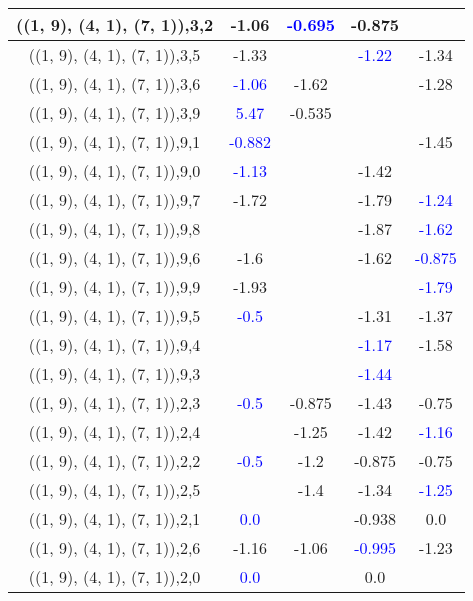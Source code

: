 \documentclass{article}
\begin{document}
\begin{center}
\begin{longtable}{|c|c|c|c|c|}
        	\hline
        	((1, 9), (4, 1), (7, 1)),3,2&-1.06& \textcolor{blue}{-0.695}&-0.875&\\
        	\hline
        	((1, 9), (4, 1), (7, 1)),3,5&-1.33&& \textcolor{blue}{-1.22}&-1.34\\
        	\hline
        	((1, 9), (4, 1), (7, 1)),3,6& \textcolor{blue}{-1.06}&-1.62&&-1.28\\
        	\hline
        	((1, 9), (4, 1), (7, 1)),3,9& \textcolor{blue}{5.47}&-0.535&&\\
        	\hline
        	((1, 9), (4, 1), (7, 1)),9,1& \textcolor{blue}{-0.882}&&&-1.45\\
        	\hline
        	((1, 9), (4, 1), (7, 1)),9,0& \textcolor{blue}{-1.13}&&-1.42&\\
        	\hline
        	((1, 9), (4, 1), (7, 1)),9,7&-1.72&&-1.79& \textcolor{blue}{-1.24}\\
        	\hline
        	((1, 9), (4, 1), (7, 1)),9,8&&&-1.87& \textcolor{blue}{-1.62}\\
        	\hline
        	((1, 9), (4, 1), (7, 1)),9,6&-1.6&&-1.62& \textcolor{blue}{-0.875}\\
        	\hline
        	((1, 9), (4, 1), (7, 1)),9,9&-1.93&&& \textcolor{blue}{-1.79}\\
        	\hline
        	((1, 9), (4, 1), (7, 1)),9,5& \textcolor{blue}{-0.5}&&-1.31&-1.37\\
        	\hline
        	((1, 9), (4, 1), (7, 1)),9,4&&& \textcolor{blue}{-1.17}&-1.58\\
        	\hline
        	((1, 9), (4, 1), (7, 1)),9,3&&& \textcolor{blue}{-1.44}&\\
        	\hline
        	((1, 9), (4, 1), (7, 1)),2,3& \textcolor{blue}{-0.5}&-0.875&-1.43&-0.75\\
        	\hline
        	((1, 9), (4, 1), (7, 1)),2,4&&-1.25&-1.42& \textcolor{blue}{-1.16}\\
        	\hline
        	((1, 9), (4, 1), (7, 1)),2,2& \textcolor{blue}{-0.5}&-1.2&-0.875&-0.75\\
        	\hline
        	((1, 9), (4, 1), (7, 1)),2,5&&-1.4&-1.34& \textcolor{blue}{-1.25}\\
        	\hline
        	((1, 9), (4, 1), (7, 1)),2,1& \textcolor{blue}{0.0}&&-0.938&0.0\\
        	\hline
        	((1, 9), (4, 1), (7, 1)),2,6&-1.16&-1.06& \textcolor{blue}{-0.995}&-1.23\\
        	\hline
        	((1, 9), (4, 1), (7, 1)),2,0& \textcolor{blue}{0.0}&&0.0&\\

\end{longtable}
\end{center}
\end{document}
